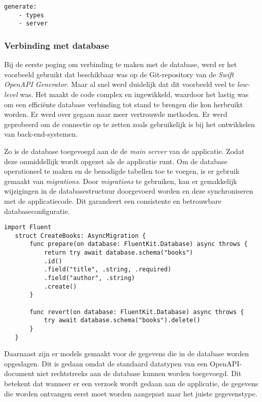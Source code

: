 \begin{lstlisting}[caption=openapi-generator-config.yaml file]
    generate:
    - types
    - server
\end{lstlisting}


\subsubsection{Verbinding met database}

Bij de eerste poging om verbinding te maken met de database, werd er het voorbeeld gebruikt dat beschikbaar was op de Git-repository van de \textit{Swift OpenAPI Generator}. Maar al snel werd duidelijk dat dit voorbeeld veel te \textit{low-level} was. Het maakt de code complex en ingewikkeld, waardoor het lastig was om een efficiënte database verbinding tot stand te brengen die kon herbruikt worden.  
Er werd over gegaan naar meer vertrouwde methoden. Er werd geprobeerd om de connectie op te zetten zoals gebruikelijk is bij het ontwikkelen van back-end-systemen. 

Zo is de database toegevoegd aan de de \textit{main server} van de applicatie. Zodat deze onmiddellijk wordt opgezet als de applicatie runt. Om de database operationeel te maken en de benodigde tabellen toe te voegen, is er gebruik gemaakt van \textit{migrations}. Door \textit{migrations} te gebruiken, kan er gemakkelijk wijzigingen in de databasestructuur doorgevoerd worden en deze synchroniseren met de applicatiecode. Dit garandeert een consistente en betrouwbare databaseconfiguratie.
\begin{lstlisting}[caption=Migration file]
   import Fluent
   struct CreateBooks: AsyncMigration {
       func prepare(on database: FluentKit.Database) async throws {
           return try await database.schema("books")
           .id()
           .field("title", .string, .required)
           .field("author", .string)
           .create()
       }
       
       func revert(on database: FluentKit.Database) async throws {
           try await database.schema("books").delete()
       }
   } 
\end{lstlisting}

Daarnaast zijn er  models gemaakt voor de gegevens die in de database worden opgeslagen. Dit is gedaan omdat de standaard datatypen van een OpenAPI-document niet rechtstreeks aan de database kunnen worden toegevoegd. Dit betekent dat wanneer er een verzoek wordt gedaan aan de applicatie, de gegevens die worden ontvangen eerst moet worden aangepast naar het juiste gegevenstype.


